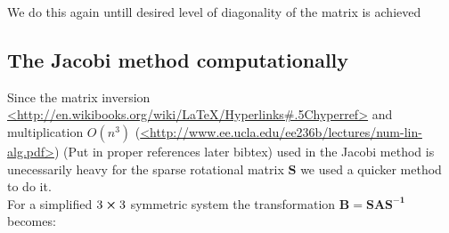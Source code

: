 \documentclass[11pt,a4wide]{article}
\begin{document}
	\noindent We do this again untill desired level of diagonality of the matrix is achieved
	
	\subsection{The Jacobi method computationally}
		Since the matrix inversion \url{<http://en.wikibooks.org/wiki/LaTeX/Hyperlinks#.5Chyperref>} and multiplication \(O(n^3)\) (\url{<http://www.ee.ucla.edu/ee236b/lectures/num-lin-alg.pdf>}) (Put in proper references later bibtex) used in the Jacobi method is unecessarily heavy for the sparse
		rotational matrix \(\mathbf{S}\) we used a quicker method to do it.\\
		
		For a simplified \(3\cross3\) symmetric system the transformation \(\mathbf{B}=\mathbf{SAS^{-1}}\) becomes:
		
\end{document}

